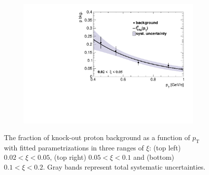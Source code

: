 \begin{figure}[t!]
\begin{subfigure}{.49\textwidth}
		\includegraphics[width=\textwidth,page=3]{chapters/chrgSTAR/img/DCAproton/p_bkg_summary.pdf}
	\end{subfigure}
	\begin{minipage}{.49\textwidth}
			\caption{The fraction of knock-out proton background  as a function of $p_\textrm{T}$   with  fitted parametrizations in three ranges of $\xi$: (top left) $0.02 < \xi < 0.05$, (top right) $0.05<\xi<0.1$ and (bottom) $0.1<\xi<0.2$. Gray bands represent total systematic uncertainties.}
			\label{fig:protonBkgSystSummary}
	\end{minipage}
	\vspace{-2cm}
\end{figure}


 
 \FloatBarrier